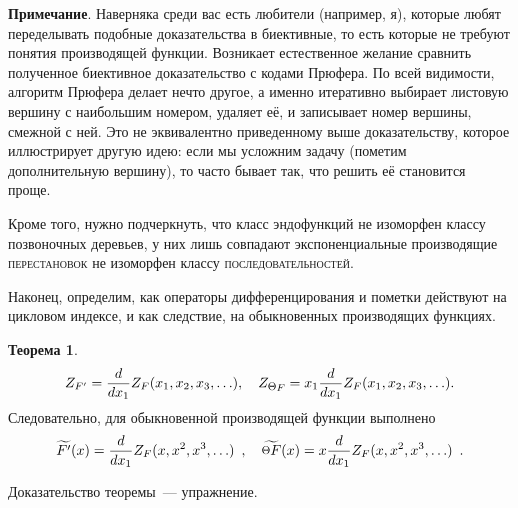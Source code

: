 \documentclass{article}
\def \point {\raisebox{.1\height}{\scalebox{0.8}{$\Theta$}}}
\theoremstyle{definition}
\newtheorem*{theorem}{Теорема}
\begin{document}
{\footnotesize
\textbf{Примечание}. Наверняка среди вас есть любители (например, я), которые
любят переделывать подобные доказательства в биективные, то есть которые не
требуют понятия производящей функции. Возникает естественное желание сравнить
полученное биективное доказательство с кодами Прюфера. По всей видимости,
алгоритм Прюфера делает нечто другое, а именно итеративно выбирает листовую вершину с
наибольшим номером, удаляет её, и записывает номер вершины, смежной с ней. Это
не эквивалентно приведенному выше доказательству, которое иллюстрирует другую
идею: если мы усложним задачу (пометим дополнительную вершину), то часто бывает
так, что решить её становится проще.

Кроме того, нужно подчеркнуть, что класс эндофункций не изоморфен классу
позвоночных деревьев, у них лишь совпадают экспоненциальные производящие
\textsc{перестановок} не изоморфен классу \textsc{последовательностей}.}

Наконец, определим, как операторы дифференцирования и пометки действуют на
цикловом индексе, и как следствие, на обыкновенных производящих функциях.
\begin{theorem}
\[
    Z_{F'} = \dfrac{d}{dx_1} Z_F(x_1, x_2, x_3, \ldots), \quad
    Z_{\point F} = x_1 \dfrac{d}{d x_1} Z_F(x_1, x_2, x_3, \ldots). 
\]
Следовательно, для обыкновенной производящей функции выполнено
\[
    \widetilde{F'}(x) = \dfrac{d}{dx_1} Z_F(x, x^2, x^3, \ldots)\enspace ,
\quad
    \widetilde{\point F}(x) = x \dfrac{d}{dx_1} Z_F(x, x^2, x^3, \ldots)
\enspace .
\]
\end{theorem}
Доказательство теоремы~--- упражнение.
\end{document}

